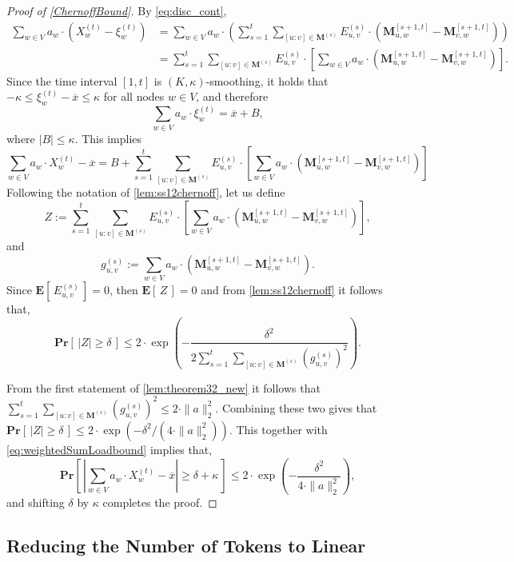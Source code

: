 \documentclass[twoside,leqno]{article}
\newcommand{\Pro}[1]{\mathbf{Pr} \left[\,#1\,\right]}
\newcommand{\Ex}[1]{\mathbf{E} \left[\,#1\,\right]}
\newcommand{\M}{\mathbf{M}}
\DeclareMathOperator{\1}{\mathbf{1}}
\numberwithin{equation}{section}
\begin{document}
\begin{proof}[Proof of \cref{ChernoffBound}]
By \cref{eq:disc_cont},
\begin{align*}
\sum_{w\in V} a_w \cdot \left( X_w^{(t)} - \xi_w^{(t)} \right) &= \sum_{w \in V} a_w \cdot \left( \sum_{s=1}^{t} \sum_{[u:v] \in \M^{(s)}} E_{u,v}^{(s)} \cdot \left( \M_{u,w}^{[s+1,t]} - \M_{v,w}^{[s+1,t]} \right) \right) \\
&= \sum_{s=1}^{t} \sum_{[u:v] \in \M^{(s)}} E_{u,v}^{(s)} \cdot \left[ \sum_{w \in V} a_w \cdot \left( \M_{u,w}^{[s+1,t]} -\M_{v,w}^{[s+1,t]} \right) \right].
\end{align*}
Since the time interval $[1,t]$ is $(K,\kappa)$-smoothing, it holds that $-\kappa \le \xi_{w}^{(t)} - \overline{x} \le \kappa$ for all nodes $w \in V$, and therefore
\[
\sum_{w \in V} a_w \cdot \xi_w^{(t)} = \overline{x} + B,
\]
where $|B| \leq \kappa$. This implies 
\begin{equation}\label{eq:weightedSumLoadbound}
\sum_{w \in V} a_w \cdot X_w^{(t)} -\overline{x} = B + 
\sum_{s=1}^{t} \sum_{[u:v] \in \M^{(s)}} E_{u,v}^{(s)} \cdot \left[ \sum_{w \in V} a_w \cdot \left( \M_{u,w}^{[s+1,t]} -  \M_{v,w}^{[s+1,t]} \right) \right] 
\end{equation}
Following the notation of \cref{lem:ss12chernoff}, let us define
\[
Z:= \sum_{s=1}^{t} \sum_{[u:v] \in \M^{(s)}} E_{u,v}^{(s)} \cdot \left[ \sum_{w \in V} a_w \cdot \left( \M_{u,w}^{[s+1,t]} -  \M_{v,w}^{[s+1,t]} \right) \right],
\]
and
\[
 g_{u,v}^{(s)} := \sum_{w \in V} a_w \cdot \left( \M_{u,w}^{[s+1,t]} -  \M_{v,w}^{[s+1,t]} \right).
\]
Since $\Ex{E_{u,v}^{(s)}}=0$, then $\Ex{Z}=0$ and from \cref{lem:ss12chernoff} it follows that,
\[
\Pro{\lvert Z \rvert \ge \delta} \le 2 \cdot \exp\left( -\frac{\delta^2}{2 \sum_{s=1}^t \sum_{[u:v]\in \M^{(s)} } \left(g_{u,v}^{(s)}\right)^2 }\right) .
\]

From the first statement of \cref{lem:theorem32_new} 
it follows that
$\sum_{s=1}^{t} \sum_{[u:v] \in \M^{(s)}} \left( g_{u,v}^{(s)}\right)^2 \le 2\cdot \|a\|_2^2$.
Combining these two gives that
$\Pro{\lvert Z \rvert \ge \delta} \le 2 \cdot \exp( -{\delta^2}/(4 \cdot \|a\|_2^2))$. This together with \cref{eq:weightedSumLoadbound} implies that,
\[
\Pro{\left| \sum_{w\in V}a_w\cdot X_w^{(t)}-\overline{x} \right| \ge \delta+\kappa} \le  2 \cdot \exp\left( -\frac{\delta^2}{4 \cdot \|a\|_2^2}\right),
\]
and shifting $\delta$ by $\kappa$ completes the proof.
\end{proof}

\subsection{Reducing the Number of Tokens to Linear}
\end{document}
